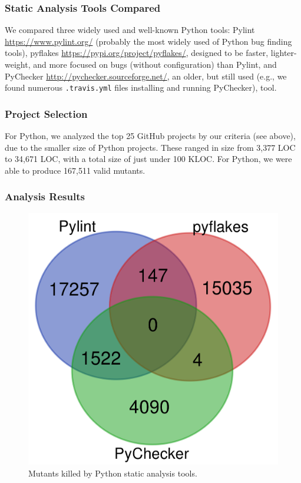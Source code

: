 \subsubsection{Static Analysis Tools Compared}

We compared three widely used and well-known Python tools:  Pylint \url{https://www.pylint.org/} (probably the most widely used of Python bug finding tools), pyflakes \url{https://pypi.org/project/pyflakes/}, designed to be faster, lighter-weight, and more focused on bugs (without configuration) than Pylint, and PyChecker \url{http://pychecker.sourceforge.net/}, an older, but still used (e.g., we found numerous {\tt .travis.yml} files installing and running PyChecker), tool.

\subsubsection{Project Selection}

For Python, we analyzed the top 25 GitHub projects by our criteria (see above), due to the smaller size of Python projects.  These ranged in size from 3,377 LOC to 34,671 LOC, with a total size of just under 100 KLOC.  For Python, we were able to produce 167,511 valid mutants.

\subsubsection{Analysis Results}


\begin{figure}
  \centering
  \includegraphics[width=0.35\columnwidth]{python.png}
  \caption{Mutants killed by Python static analysis tools.}
  \label{fig:pythonvenn}
\end{figure}

